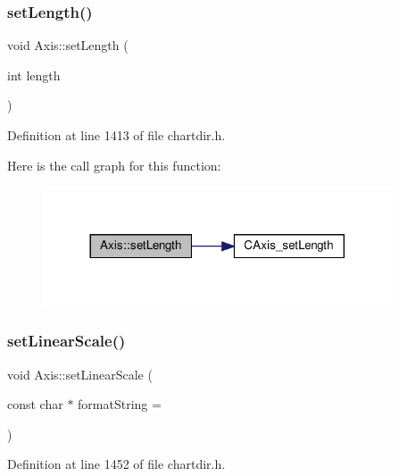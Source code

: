 \subsubsection{\texorpdfstring{set\+Length()}{setLength()}}
{\footnotesize\ttfamily void Axis\+::set\+Length (\begin{DoxyParamCaption}\item[{int}]{length }\end{DoxyParamCaption})\hspace{0.3cm}{\ttfamily [inline]}}



Definition at line 1413 of file chartdir.\+h.

Here is the call graph for this function\+:
\nopagebreak
\begin{figure}[H]
\begin{center}
\leavevmode
\includegraphics[width=293pt]{class_axis_a975e48ae1b4d4d80e86f267f7272fd87_cgraph}
\end{center}
\end{figure}
\mbox{\label{class_axis_a69fe2919bd8bcf21a5139dc1e0a511c4}} 
\subsubsection{\texorpdfstring{set\+Linear\+Scale()}{setLinearScale()}\hspace{0.1cm}{\footnotesize\ttfamily [1/3]}}
{\footnotesize\ttfamily void Axis\+::set\+Linear\+Scale (\begin{DoxyParamCaption}\item[{const char $\ast$}]{format\+String = {} }\end{DoxyParamCaption})\hspace{0.3cm}{\ttfamily [inline]}}



Definition at line 1452 of file chartdir.\+h.

